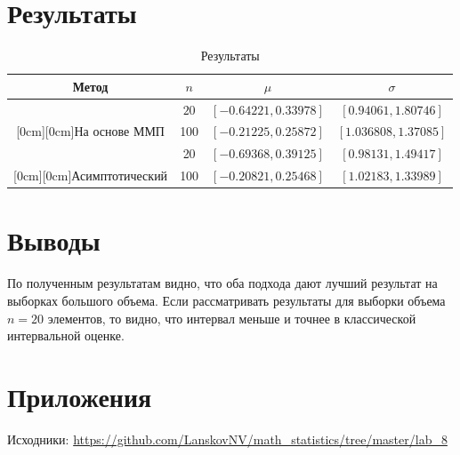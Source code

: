 \documentclass[12pt]{report}
\begin{document}
\section{Результаты}

\begin{table}[H]
\caption{Результаты}
\label{tab:my_label1}
\begin{center}
\vspace{5mm}
\begin{tabular}{|c|c|c|c|}
\hline
Метод & $n$&$\mu$&$\sigma$\\
\hline
&$20$&	$[-0.64221, 0.33978]$&		$[0.94061, 1.80746]$ \\
\cline{2-4}
\raisebox{1.5ex}[0cm][0cm]{На основе ММП}&100&	$[-0.21225, 0.25872]$&	$[1.036808, 1.37085]$\\
\hline
&20&	$[-0.69368, 0.39125]$&		$[0.98131, 1.49417]$ \\
\cline{2-4}
\raisebox{1.5ex}[0cm][0cm]{Асимптотический}&100	&$[-0.20821, 0.25468]$&	$[1.02183, 1.33989]$\\
\hline
\end{tabular}
\end{center}
\end{table}


\section{Выводы}

По полученным результатам видно, что оба подхода дают лучший результат на выборках большого объема. Если рассматривать результаты для выборки объема $n=20$ элементов, то видно, что интервал меньше и точнее в классической интервальной оценке.

\section{Приложения}

Исходники: \url{https://github.com/LanskovNV/math_statistics/tree/master/lab_8}
\end{document}
